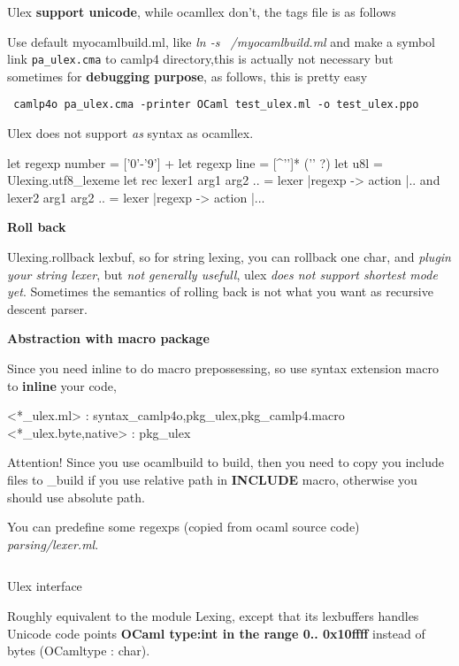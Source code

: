 
Ulex \textbf{ support unicode}, while ocamllex don't, the tags file is
as follows


Use default myocamlbuild.ml, like \emph{ln -s ~/myocamlbuild.ml} and
make a symbol link \verb|pa_ulex.cma| to camlp4 directory,this is
actually not necessary but sometimes for \textbf{ debugging purpose},
as follows, this is pretty easy 

 \verb| camlp4o pa_ulex.cma -printer OCaml test_ulex.ml -o test_ulex.ppo|


Ulex does not support \textit{ as } syntax as ocamllex.

\begin{redcode} 
let regexp number = ['0'-'9'] + 
let regexp line = [^'\n']* ('\n' ?)  
let u8l = Ulexing.utf8_lexeme 
let rec lexer1 arg1 arg2 .. = lexer 
   |regexp -> action |..  
and lexer2 arg1 arg2 .. = lexer
   |regexp -> action |...
\end{redcode}

\textbf{Roll back} 

Ulexing.rollback lexbuf, so for string lexing, you
can rollback one char, and \textit{plugin your string lexer}, but
\textit{not generally usefull}, ulex \textit{does not support shortest
mode yet}. Sometimes the semantics of rolling back is not what you
want as recursive descent parser.

\textbf{Abstraction with macro package} 

Since you need inline to do
macro prepossessing, so use syntax extension macro to \textbf{ inline}
your code,


\begin{bluetext}
 <*_ulex.ml> : syntax_camlp4o,pkg_ulex,pkg_camlp4.macro
 <*_ulex.{byte,native}> : pkg_ulex
\end{bluetext}

Attention!  Since you use ocamlbuild to build, then you need to copy
you include files to \_build if you use relative path in
\textbf{INCLUDE} macro, otherwise you should use absolute path.

 You can predefine some regexps (copied from ocaml source code)
\textit{ parsing/lexer.ml}.
\inputminted{ocaml}{/Users/bobzhang1988/predefine_ulex.ml}


Ulex interface

Roughly equivalent to the module Lexing, except that its lexbuffers
handles Unicode code points\textbf{ OCaml type:int in the range
0.. 0x10ffff} instead of bytes (OCamltype : char).

